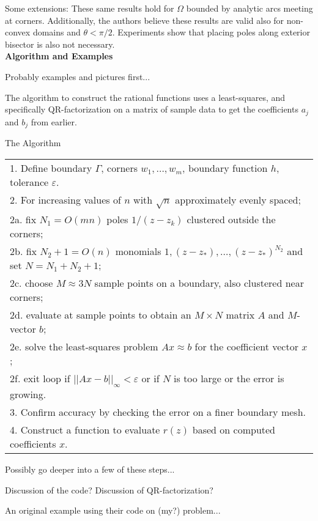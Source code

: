 \documentclass[12]{article}
\begin{document}
	Some extensions: These same results hold for $\Omega$ bounded by analytic arcs meeting at corners. Additionally, the authors believe these results are valid also for non-convex domains and $\theta < \pi /2$. Experiments show that placing poles along exterior bisector is also not necessary.\\
	
\noindent
\textbf{Algorithm and Examples}

	Probably examples and pictures first...
	
	The algorithm to construct the rational functions uses a least-squares, and specifically QR-factorization on a matrix of sample data to get the coefficients $a_j$ and $b_j$ from earlier.
	
	\begin{table}[h] The Algorithm \\
		\begin{tabular}{l}
			1. Define boundary $\Gamma$, corners $w_1,\ldots, w_m$, boundary function $h$, tolerance $\varepsilon$.	\\
			2. For increasing values of $n$ with $\sqrt{n}$	approximately evenly spaced; \\
			\: 2a. fix $N_1=O(mn)$ poles $1/(z-z_k)$ clustered outside the corners; \\
			\: 2b. fix $N_2+1=O(n)$ monomials $1,(z-z_*),\ldots,(z-z_*)^{N_2}$ and set $N=N_1+N_2+1$; \\
			\: 2c. choose $M\approx 3N$ sample points on a boundary, also clustered near corners; \\
			\: 2d. evaluate at sample points to obtain an $M\times N$ matrix $A$ and $M$-vector $b$; \\
			\: 2e. solve the least-squares problem $Ax\approx b$ for the coefficient vector $x$; \\
			\: 2f. exit loop if $||Ax-b||_\infty < \varepsilon$ or if $N$ is too large or the error is growing. \\
			3. Confirm accuracy by checking the error on a finer boundary mesh. \\
			4. Construct a function to evaluate $r(z)$ based on computed coefficients $x$.
		\end{tabular}
	\end{table}
	
	Possibly go deeper into a few of these steps... 
	
	Discussion of the code? Discussion of QR-factorization?
	
	An original example using their code on (my?) problem...
\end{document}
